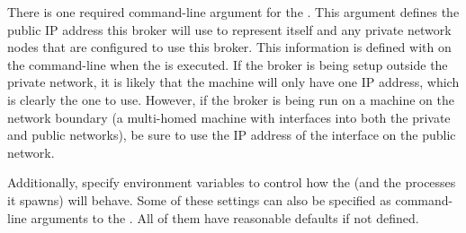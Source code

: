 There is one required command-line argument for the .
This argument defines the public IP address this broker will use to
represent itself and any private network nodes that are configured to
use this broker.
This information is defined with  on the
command-line when the  is executed.
If the broker is being setup outside the private network, it is likely
that the machine will only have one IP address, which is clearly the
one to use.
However, if the broker is being run on a machine on the
network boundary (a multi-homed machine with interfaces into both the
private and public networks), be sure to use the IP address of the
interface on the public network.

Additionally, specify environment variables to control
how the  (and the 
processes it spawns) will behave.
Some of these settings can also be specified as command-line
arguments to the .
All of them have reasonable defaults if not defined.

